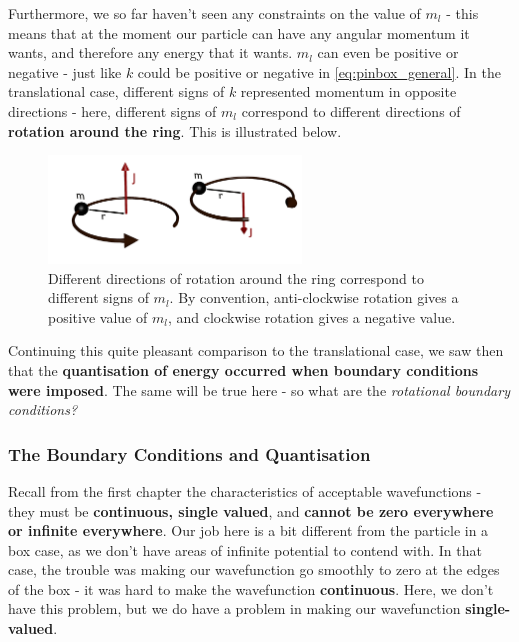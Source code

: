 \documentclass{memoir}[11pt,oneside,a4paper,openany]
\begin{document}
Furthermore, we so far haven't seen any constraints on the value of $m_l$ - this means that at the moment our particle can have any angular momentum it wants, and therefore any energy that it wants. $m_l$ can even be positive or negative - just like $k$ could be positive or negative in \autoref{eq:pinbox_general}. In the translational case, different signs of $k$ represented momentum in opposite directions - here, different signs of $m_l$ correspond to different directions of \textbf{rotation around the ring}. This is illustrated below. 
\begin{figure}[h]
	\centering
	\includegraphics[width=0.6\textwidth]{angular_momentum_directions}
	\caption{Different directions of rotation around the ring correspond to different signs of $m_l$. By convention, anti-clockwise rotation gives a positive value of $m_l$, and clockwise rotation gives a negative value.}
\end{figure}

Continuing this quite pleasant comparison to the translational case, we saw then that the \textbf{quantisation of energy occurred when boundary conditions were imposed}. The same will be true here - so what are the \emph{rotational boundary conditions?}

\subsubsection{The Boundary Conditions and Quantisation}
Recall from the first chapter the characteristics of acceptable wavefunctions - they must be \textbf{continuous, single valued}, and \textbf{cannot be zero everywhere or infinite everywhere}. Our job here is a bit different from the particle in a box case, as we don't have areas of infinite potential to contend with. In that case, the trouble was making our wavefunction go smoothly to zero at the edges of the box - it was hard to make the wavefunction \textbf{continuous}. Here, we don't have this problem, but we do have a problem in making our wavefunction \textbf{single-valued}. 
\end{document}

